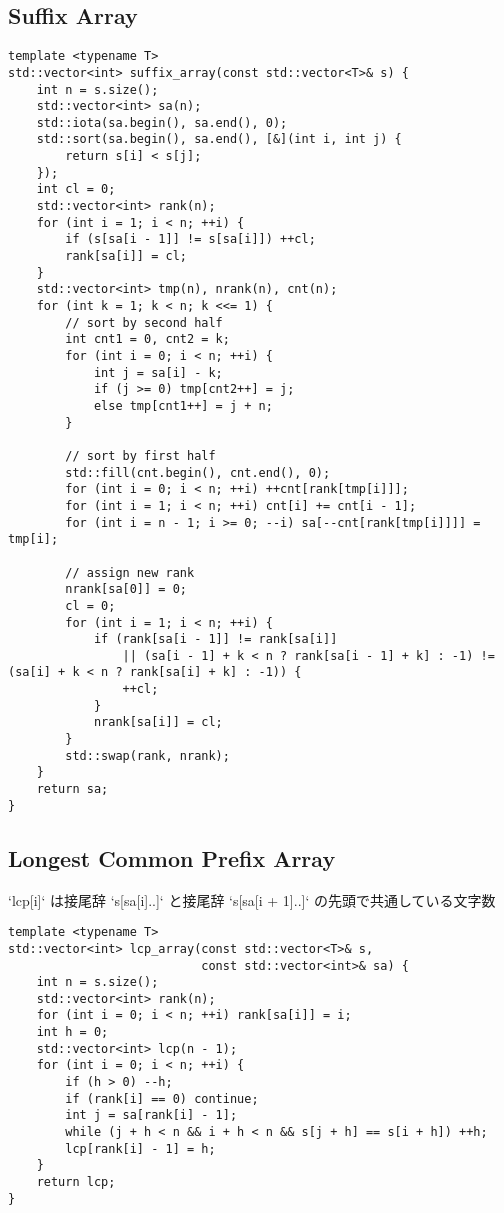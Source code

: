 \subsection{Suffix Array}

\begin{lstlisting}
template <typename T>
std::vector<int> suffix_array(const std::vector<T>& s) {
    int n = s.size();
    std::vector<int> sa(n);
    std::iota(sa.begin(), sa.end(), 0);
    std::sort(sa.begin(), sa.end(), [&](int i, int j) {
        return s[i] < s[j];
    });
    int cl = 0;
    std::vector<int> rank(n);
    for (int i = 1; i < n; ++i) {
        if (s[sa[i - 1]] != s[sa[i]]) ++cl;
        rank[sa[i]] = cl;
    }
    std::vector<int> tmp(n), nrank(n), cnt(n);
    for (int k = 1; k < n; k <<= 1) {
        // sort by second half
        int cnt1 = 0, cnt2 = k;
        for (int i = 0; i < n; ++i) {
            int j = sa[i] - k;
            if (j >= 0) tmp[cnt2++] = j;
            else tmp[cnt1++] = j + n;
        }

        // sort by first half
        std::fill(cnt.begin(), cnt.end(), 0);
        for (int i = 0; i < n; ++i) ++cnt[rank[tmp[i]]];
        for (int i = 1; i < n; ++i) cnt[i] += cnt[i - 1];
        for (int i = n - 1; i >= 0; --i) sa[--cnt[rank[tmp[i]]]] = tmp[i];

        // assign new rank
        nrank[sa[0]] = 0;
        cl = 0;
        for (int i = 1; i < n; ++i) {
            if (rank[sa[i - 1]] != rank[sa[i]]
                || (sa[i - 1] + k < n ? rank[sa[i - 1] + k] : -1) != (sa[i] + k < n ? rank[sa[i] + k] : -1)) {
                ++cl;
            }
            nrank[sa[i]] = cl;
        }
        std::swap(rank, nrank);
    }
    return sa;
}
\end{lstlisting}

\subsection{Longest Common Prefix Array}

\begin{small}
\begin{markdown}
`lcp[i]` は接尾辞 `s[sa[i]..]` と接尾辞 `s[sa[i + 1]..]` の先頭で共通している文字数
\end{markdown}
\end{small}

\begin{lstlisting}
template <typename T>
std::vector<int> lcp_array(const std::vector<T>& s,
                           const std::vector<int>& sa) {
    int n = s.size();
    std::vector<int> rank(n);
    for (int i = 0; i < n; ++i) rank[sa[i]] = i;
    int h = 0;
    std::vector<int> lcp(n - 1);
    for (int i = 0; i < n; ++i) {
        if (h > 0) --h;
        if (rank[i] == 0) continue;
        int j = sa[rank[i] - 1];
        while (j + h < n && i + h < n && s[j + h] == s[i + h]) ++h;
        lcp[rank[i] - 1] = h;
    }
    return lcp;
}
\end{lstlisting}

